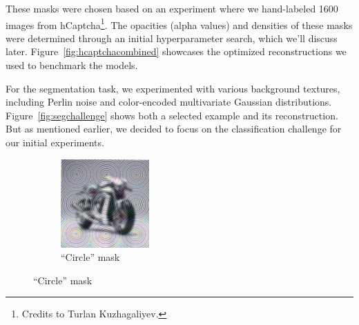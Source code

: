 \documentclass[a4paper, oneside]{discothesis}
\begin{document}
These masks were chosen based on an experiment where we hand-labeled 1600 images from hCaptcha\footnote{Credits to Turlan Kuzhagaliyev.}. The opacities (alpha values) and densities of these masks were determined through an initial hyperparameter search, which we'll discuss later. Figure~\ref{fig:hcaptchacombined} showcases the optimized reconstructions we used to benchmark the models.

For the segmentation task, we experimented with various background textures, including Perlin noise and color-encoded multivariate Gaussian distributions. Figure~\ref{fig:segchallenge} shows both a selected example and its reconstruction. But as mentioned earlier, we decided to focus on the classification challenge for our initial experiments.

\begin{figure}[th]
	\begin{subfigure}[t]{0.19\textwidth}\centering\includegraphics[width=\linewidth]{figures/hcaptcha-circle.png}\caption{``Circle'' mask}\label{fig:subfig1}\end{subfigure}
	\hfill

\end{figure}
\end{document}
